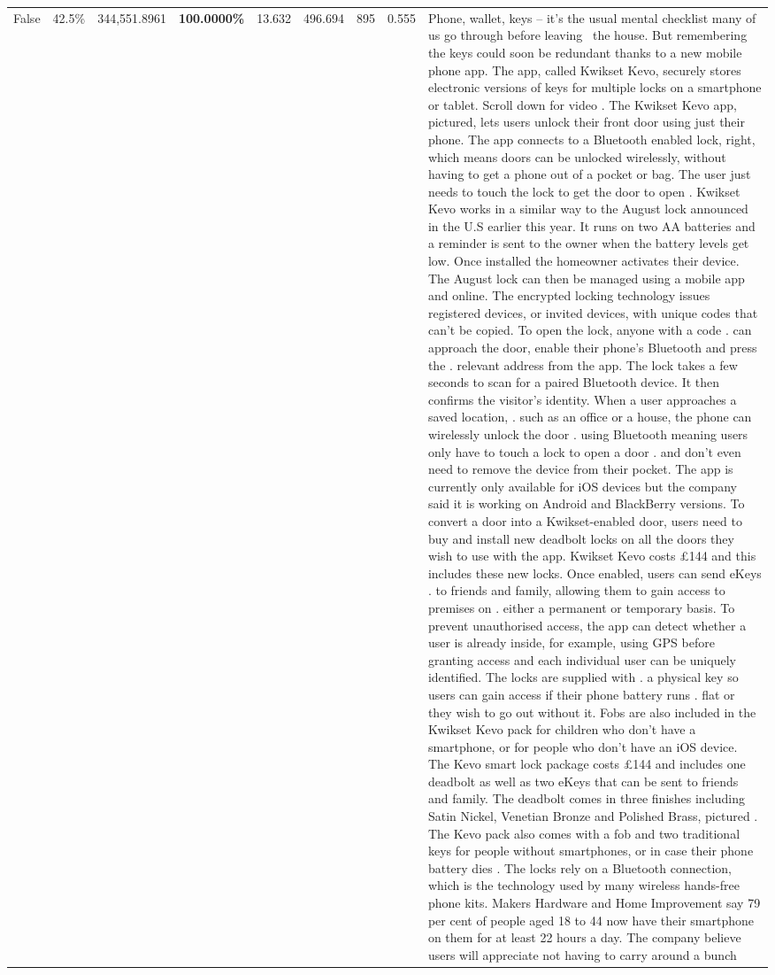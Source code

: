 \begin{table}[H]
\begin{tabular}{lllrlllll}
False & 42.5\% & 344,551.8961 & \bfseries \color{red} 100.0000\% & 13.632 & 496.694 & 895 & 0.555 & Phone, wallet, keys – it’s the usual mental checklist many of us go through before leaving  the house. But remembering the keys could soon be redundant thanks to a new mobile phone app. The app, called Kwikset Kevo, securely stores electronic versions of keys for multiple locks on a smartphone or tablet. Scroll down for video . The Kwikset Kevo app, pictured, lets users unlock their front door using just their phone. The app connects to a Bluetooth enabled lock, right, which means doors can be unlocked wirelessly, without having to get a phone out of a pocket or bag. The user just needs to touch the lock to get the door to open . Kwikset Kevo works in a similar way to the August lock announced in the U.S earlier this year. It runs on two AA batteries and a reminder is sent to the owner when the battery levels get low. Once installed the homeowner activates their device. The August lock can then be managed using a mobile app and online. The encrypted locking technology issues registered devices, or invited devices, with unique codes that can't be copied. To open the lock, anyone with a code . can approach the door, enable their phone's Bluetooth and press the . relevant address from the app. The lock takes a few seconds to scan for a paired Bluetooth device. It then confirms the visitor's identity. When a user approaches a saved location, . such as an office or a house, the phone can wirelessly unlock the door . using Bluetooth meaning users only have to touch a lock to open a door . and don't even need to remove the device from their pocket. The app is currently only available for iOS devices but the company said it is working on Android and BlackBerry versions. To convert a door into a Kwikset-enabled door, users need to buy and install new deadbolt locks on all the doors they wish to use with the app. Kwikset Kevo costs £144 and this includes these new locks. Once enabled, users can send eKeys . to friends and family, allowing them to gain access to premises on . either a permanent or temporary basis. To prevent unauthorised access, the app can detect whether a user is already inside, for example, using GPS before granting access and each individual user can be uniquely identified. The locks are supplied with . a physical key so users can gain access if their phone battery runs . flat or they wish to go out without it. Fobs are also included in the Kwikset Kevo pack for children who don't have a smartphone, or for people who don't have an iOS device. The Kevo smart lock package costs £144 and includes one deadbolt as well as two eKeys that can be sent to friends and family. The deadbolt comes in three finishes including Satin Nickel, Venetian Bronze and Polished Brass, pictured . The Kevo pack also comes with a fob and two traditional keys for people without smartphones, or in case their phone battery dies . The locks rely on a Bluetooth connection, which is the technology used by many wireless hands-free phone kits. Makers Hardware and Home Improvement say 79 per cent of people aged 18 to 44 now have their smartphone on them for at least 22 hours a day. The company believe users will appreciate not having to carry around a bunch 
\end{tabular}
\end{table}
